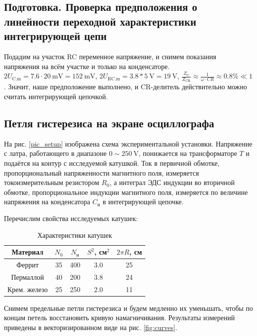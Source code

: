 \documentclass[12pt, a4paper]{article}
\newcommand{\V}{~\mathrm{V}}
\newcommand{\mV}{~\mathrm{mV}}
\begin{document}
\subsection{Подготовка. Проверка предположения о линейности переходной характеристики интегрирующей цепи}
Подадим на участок RC переменное напряжение, и снимем показания напряжения на всём участке и только на конденсаторе.
$2 U_\text{C.m} = 7.6 \cdot 20 \mV = 152 \mV$, $2U_\text{RC.m} = 3.8* 5 \V = 19 \V$, ${\frac{Z_\text{C}}{Z_\text{CR}} \approx \frac{1}{\omega \cdot CR} \approx 0.8 \% \ll 1}$.
Значит, наше предположение выполнено, и CR-делитель действительно можно считать интегрирующей цепочкой.

\subsection{Петля гистерезиса на экране осциллографа}
На рис. \ref{pic_setup} изображена схема экспериментальной установки.
Напряжение с латра, работающего в диапазоне $0\sim250\V$, понижается на трансформаторе $T$
и подаётся на контур с исследуемой катушкой. Ток в первичной обмотке, пропорциональный напряженности магнитного поля, измеряется
токоизмерительным резистором $R_0$, а интеграл ЭДС индукции во вторичной обмотке, пропорциональное индукции магнитного поля,
измеряется по величине напряжения на конденсатора $C_и$ в интегрирующей цепочке.

Перечислим свойства исследуемых катушек:
\begin{table}[H]
  \centering
  \begin{tabular}{|c|c|c|c|c|}
    \hline
    Материал     & $N_0$ & $N_\text{и}$ & $S^2$, см$^2$ & $2\pi R$, см \\ \hline
    Феррит       & 35    & 400                              & 3.0           & 25         \\ \hline
    Пермаллой    & 40    & 200                              & 3.8           & 24         \\ \hline
    Крем. железо & 25    & 250                              & 2.0           & 11         \\ \hline
  \end{tabular}
  \caption{Характеристики катушек}
  \label{tab:har_kat}
\end{table}

Снимем предельные петли гистерезиса и будем медленно их уменьшать, чтобы по концам петель восстановить кривую намагничивания.
Результаты измерений приведены в векторизированном виде на рис. \ref{fig:curves}.
\end{document}
